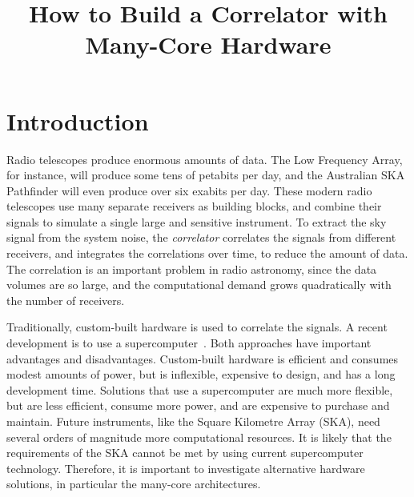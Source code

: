 \documentclass{article}
\title{How to Build a Correlator with Many-Core Hardware}
\begin{document}
\maketitle

\begin{abstract}
\end{abstract}

\section{Introduction}


Radio telescopes produce enormous amounts of data.
The Low Frequency Array, for instance, will produce some tens of
petabits per day, and the Australian SKA Pathfinder will
even produce over six exabits per day.
These modern radio telescopes use many separate receivers as building blocks, and
combine their signals to simulate a single large and sensitive instrument.
To extract the sky signal from the system noise, the \emph{correlator\/}
correlates the signals from different receivers, and integrates the correlations over time, to reduce
the amount of data. The correlation is an important problem in radio astronomy,
since the data volumes are so large, and the computational demand grows quadratically
with the number of receivers.

Traditionally, custom-built hardware is used to correlate the signals.
A recent development is to use a supercomputer~\cite{Romein:06,Romein:09b}.
Both approaches have important advantages and disadvantages.
Custom-built hardware is efficient and consumes modest amounts of power, but is
inflexible, expensive to design, and has a long development time.
Solutions that use a supercomputer are much more flexible, but are less
efficient, consume more power, and are expensive to purchase and maintain.
Future instruments, like the Square Kilometre Array (SKA), need several orders
of magnitude more computational resources.
It is likely that the requirements of the SKA cannot be met by using
current supercomputer technology. Therefore, it is important to investigate
alternative hardware solutions, in particular the many-core architectures.
\end{document}
